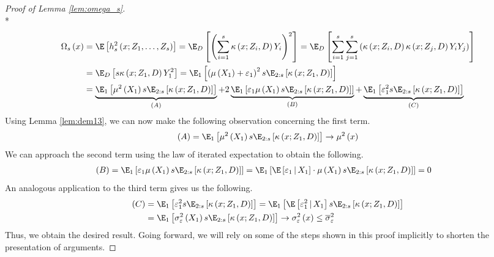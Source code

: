 \begin{proof}[Proof of Lemma \ref{lem:omega_s}]\mbox{}\\*
	\begin{equation}
		\begin{aligned}
			\Omega_{s}\left(x\right)
			 & = \E\left[h_{s}^{2}\left(x; Z_1, \ldots,  Z_{s}\right)\right]
			= \E_{D}\left[\left(\sum_{i = 1}^{s}\kappa\left(x; Z_{i}, D\right)Y_{i}\right)^2\right]
			= \E_{D}\left[\sum_{i = 1}^{s}\sum_{j = 1}^{s}\left(\kappa\left(x; Z_{i}, D\right)\kappa\left(x; Z_{j}, D\right)Y_{i}Y_{j}\right)\right] \\
			 & = \E_{D}\left[s \kappa\left(x; Z_{1}, D\right)Y_{1}^2\right]
			= \E_{1}\left[\left(\mu\left(X_1\right) + \varepsilon_{1}\right)^2 s \E_{2:s}\left[\kappa\left(x; Z_{1}, D\right)\right]\right]                   \\
			 & = \underbrace{\E_{1}\left[\mu^2\left(X_1\right) s \E_{2:s}\left[\kappa\left(x; Z_{1}, D\right)\right]\right]}_{(A)}
			+ 2\underbrace{\E_{1}\left[\varepsilon_1\mu\left(X_1\right) s \E_{2:s}\left[\kappa\left(x; Z_{1}, D\right)\right]\right]}_{(B)}
			+ \underbrace{\E_{1}\left[\varepsilon_1^{2} s \E_{2:s}\left[\kappa\left(x; Z_{1}, D\right)\right]\right]}_{(C)}
		\end{aligned}
	\end{equation}
	Using Lemma \ref{lem:dem13}, we can now make the following observation concerning the first term.
	\begin{equation}
		(A)
		= \E_{1}\left[\mu^2\left(X_1\right) s \E_{2:s}\left[\kappa\left(x; Z_{1}, D\right)\right]\right]
		\rightarrow \mu^2\left(x\right)
	\end{equation}
	We can approach the second term using the law of iterated expectation to obtain the following.
	\begin{equation}
		\begin{aligned}
			(B)
			 & = \E_{1}\left[\varepsilon_1\mu\left(X_1\right) s \E_{2:s}\left[\kappa\left(x; Z_{1}, D\right)\right]\right]
			= \E_{1}\left[\E\left[\varepsilon_1 \, | \, X_1 \right] \cdot \mu\left(X_1\right) s \E_{2:s}\left[\kappa\left(x; Z_{1}, D\right)\right]\right]
			= 0
		\end{aligned}
	\end{equation}
	An analogous application to the third term gives us the following.
	\begin{equation}
		\begin{aligned}
			(C)
			 & = \E_{1}\left[\varepsilon_1^{2} s \E_{2:s}\left[\kappa\left(x; Z_{1}, D\right)\right]\right]
			= \E_{1}\left[\E\left[\varepsilon_1^{2} \, | \, X_1\right] s \E_{2:s}\left[\kappa\left(x; Z_{1}, D\right)\right]\right] \\
			 & = \E_{1}\left[\sigma^2_{\varepsilon}\left(X_1\right) s \E_{2:s}\left[\kappa\left(x; Z_{1}, D\right)\right]\right]
			\rightarrow \sigma^2_{\varepsilon}\left(x\right)
			\leq \overline{\sigma}^2_{\varepsilon}
		\end{aligned}
	\end{equation}
	Thus, we obtain the desired result.
	Going forward, we will rely on some of the steps shown in this proof implicitly to shorten the presentation of arguments.
\end{proof}

